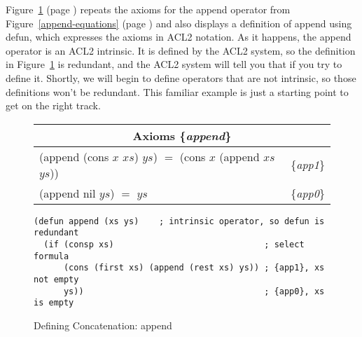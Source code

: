 Figure~\ref{fig:append-defun} (page \pageref{fig:append-defun})
repeats the axioms for the \textsf{append} operator from
Figure~\ref{append-equations} (page \pageref{append-equations})
and also displays a definition of \textsf{append} using \textsf{defun},
which expresses the axioms in ACL2 notation.
As it happens, the \textsf{append} operator is an ACL2 intrinsic.
It is defined by the ACL2 system, so the definition
in Figure~\ref{fig:append-defun} is redundant,
and the ACL2 system will tell you that if you try to define it.
Shortly, we will begin to define operators that are not
intrinsic, so those definitions won't be redundant.
This familiar example is just
a starting point to get on the right track.

\begin{figure}
\begin{center}
\begin{tabular}{ll}
\multicolumn{2}{c}{Axioms \{\emph{append}\}} \\
\hline
\textsf{(append (cons $x$ $xs$) $ys$)} $=$ \textsf{(cons $x$ (append $xs$ $ys$))} & \{\emph{app1}\} \\
\textsf{(append nil $ys$)} $=$  $ys$                                     & \{\emph{app0}\} \\
\end{tabular}
\begin{code}
\begin{verbatim}
(defun append (xs ys)    ; intrinsic operator, so defun is redundant
  (if (consp xs)                              ; select formula
      (cons (first xs) (append (rest xs) ys)) ; {app1}, xs not empty
      ys))                                    ; {app0}, xs is empty
\end{verbatim}
\end{code}
\end{center}
\caption{Defining Concatenation: append}
\label{fig:append-defun}
\end{figure}


